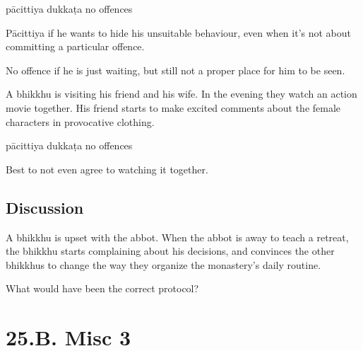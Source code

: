 \begin{exam}{\autoExamName}
\begin{problem*}
\begin{parts}
      \bigskip

      \begin{answers}{3}
        \bChoices
         pācittiya\eAns
         dukkaṭa\eAns
         no offences\eAns
        \eChoices
      \end{answers}

      \begin{solution}
        Pācittiya if he wants to hide his unsuitable behaviour, even when it's not about committing a particular offence.

        No offence if he is just waiting, but still not a proper place for him to be seen.
      \end{solution}

      \bigskip

      \item A bhikkhu is visiting his friend and his wife. In the evening they
      watch an action movie together. His friend starts to make excited comments
      about the female characters in provocative clothing.

      \bigskip

      \begin{answers}{3}
        \bChoices
         pācittiya\eAns
         dukkaṭa\eAns
         no offences\eAns
        \eChoices
      \end{answers}

      \begin{solution}
        Best to not even agree to watching it together.
      \end{solution}

    \end{parts}

  \end{problem*}

\end{exam}

\section*{Discussion}

A bhikkhu is upset with the abbot. When the abbot is away to teach a retreat,
the bhikkhu starts complaining about his decisions, and convinces the other
bhikkhus to change the way they organize the monastery's daily routine.

What would have been the correct protocol?

\chapter{25.B. Misc 3}
\renewcommand*{\theChapterTitle}{25.B. Misc 3}
